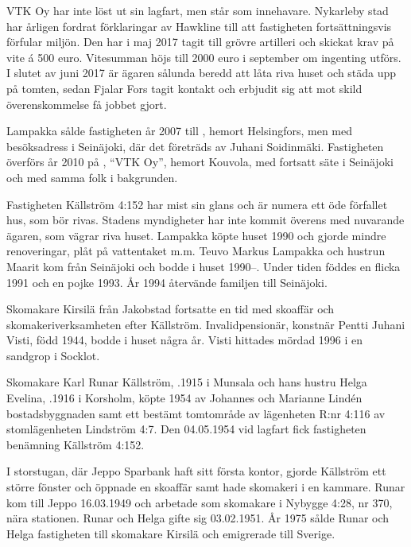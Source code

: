 VTK Oy har inte löst ut sin lagfart, men står som innehavare. Nykarleby stad har årligen fordrat förklaringar av Hawkline till att fastigheten fortsättningsvis förfular miljön. Den har i maj 2017 tagit till grövre artilleri och skickat krav på vite á 500 euro. Vitesumman höjs till 2000 euro i september om ingenting utförs. I slutet av juni 2017 är ägaren sålunda beredd att låta riva huset och städa upp på tomten, sedan Fjalar Fors tagit kontakt och erbjudit sig att mot skild överenskommelse få jobbet gjort.


Lampakka sålde fastigheten år 2007 till , hemort Helsingfors, men med besöksadress i Seinäjoki, där det företräds av Juhani Soidinmäki. Fastigheten överförs år 2010 på , ``VTK Oy'', hemort Kouvola, med fortsatt säte i Seinäjoki och med samma folk i bakgrunden.


Fastigheten Källström 4:152 har mist sin glans och är numera ett öde förfallet hus, som bör rivas. Stadens myndigheter har inte kommit överens med nuvarande ägaren, som vägrar riva huset. Lampakka köpte huset 1990 och gjorde mindre renoveringar, plåt på vattentaket m.m. Teuvo Markus Lampakka och hustrun Maarit kom från Seinäjoki och bodde i huset 1990--. Under tiden föddes en flicka 1991 och en pojke 1993. År 1994 återvände familjen till Seinäjoki.


Skomakare Kirsilä  från Jakobstad fortsatte en tid med skoaffär och skomakeriverksamheten	efter Källström. Invalidpensionär, konstnär Pentti Juhani Visti, född 1944, bodde i huset några år. Visti hittades mördad 1996 i	en sandgrop i Socklot.


Skomakare Karl Runar Källström, .1915 i Munsala och hans hustru Helga Evelina, .1916 i Korsholm, köpte 1954 av Johannes och Marianne Lindén bostadsbyggnaden samt ett bestämt tomtområde av lägenheten R:nr 4:116  av stomlägenheten Lindström 4:7. Den 04.05.1954 vid lagfart fick fastigheten benämning Källström 4:152.

I storstugan, där Jeppo Sparbank haft sitt första kontor, gjorde Källström ett större fönster och	öppnade en skoaffär samt hade skomakeri i en kammare. Runar kom till Jeppo 16.03.1949 och arbetade som skomakare i Nybygge 4:28, nr 370, nära stationen. Runar och Helga gifte sig 03.02.1951. År 1975 sålde Runar och Helga fastigheten till skomakare Kirsilä och emigrerade till Sverige.


